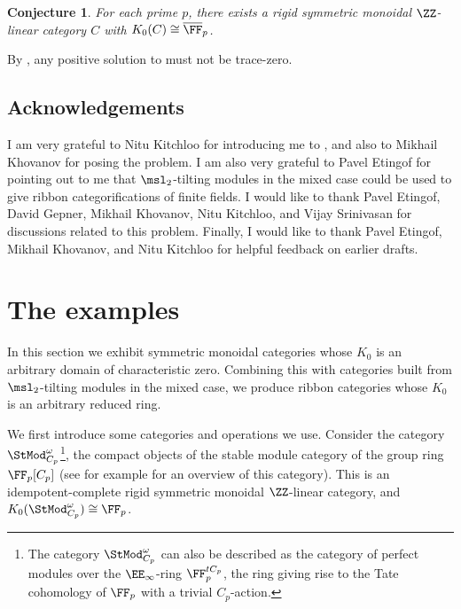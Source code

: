 \documentclass[12pt,oneside]{article}
\newcounter{counter}
\newtheorem{cnj}[counter]{Conjecture}
\begin{document}
	\begin{cnj}\label{conj:fpbar}
	For each prime $p$, there exists a rigid symmetric monoidal $\ZZ$-linear category $C$ with $K_0(C) \cong \overline{\FF}_p$.
	\end{cnj}

	By , any positive solution to  must not be trace-zero.

		\subsection*{Acknowledgements}
	I am very grateful to Nitu Kitchloo for introducing me to , and also to Mikhail Khovanov for posing the problem. I am also very grateful to Pavel Etingof for pointing out to me that $\msl_2$-tilting modules in the mixed case could be used to give ribbon categorifications of finite fields. I would like to thank Pavel Etingof, David Gepner, Mikhail Khovanov, Nitu Kitchloo, and Vijay Srinivasan for discussions related to this problem. Finally, I would like to thank Pavel Etingof, Mikhail Khovanov, and Nitu Kitchloo for helpful feedback on earlier drafts.
	
\section{The examples}
	In this section we exhibit symmetric monoidal categories whose $K_0$ is an arbitrary domain of characteristic zero. Combining this with categories built from $\msl_2$-tilting modules in the mixed case, we produce ribbon categories whose $K_0$ is an arbitrary reduced ring.
	
	 We first introduce some categories and operations we use. Consider the category $\StMod^{\omega}_{C_p}$\footnote{The category $\StMod^{\omega}_{C_p}$ can also be described as the category of perfect modules over the $\EE_{\infty}$-ring $\FF_p^{tC_p}$, the ring giving rise to the Tate cohomology of $\FF_p$ with a trivial $C_p$-action.}, the compact objects of the stable module category of the group ring $\FF_p[C_p]$ (see for example \cite[Section 2]{mathew2015torus} for an overview of this category). This is an idempotent-complete rigid symmetric monoidal $\ZZ$-linear category, and $K_0(\StMod^{\omega}_{C_p}) \cong \FF_p$.
	
\end{document}
